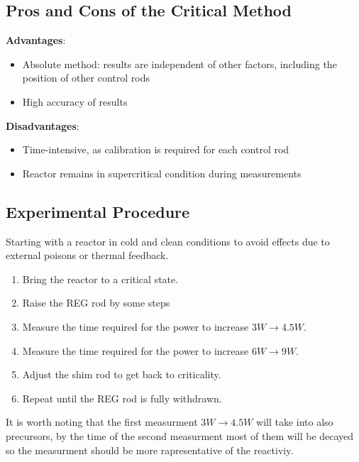 \subsection{Pros and Cons of the Critical Method} 
    \textbf{Advantages}:
    \begin{itemize}
        \item Absolute method: results are independent of other factors, including the position of other control rods
        \item High accuracy of results 
    \end{itemize}
    \textbf{Disadvantages}: 
    \begin{itemize}
        \item Time-intensive, as calibration is required for each control rod
        \item Reactor remains in supercritical condition during measurements
    \end{itemize}

\subsection{Experimental Procedure}
Starting with a reactor in cold  and clean conditions to avoid effects due to external poisons or thermal feedback.
\begin{enumerate}
    \item Bring the reactor to a critical state.
    \item Raise the REG rod by some steps
    \item Measure the time required for the power to increase $3W \rightarrow 4.5W$.
    \item Measure the time required for the power to increase $6W \rightarrow 9W$.
    \item Adjust the shim rod to get back to criticality.
    \item Repeat until the REG rod is fully withdrawn.
\end{enumerate}
It is worth noting that the first measurment $3W \rightarrow 4.5W$ will take into also precursors, by the time 
of the second measurment most of them will be decayed so the measurment should be more rapresentative of the reactiviy. \\